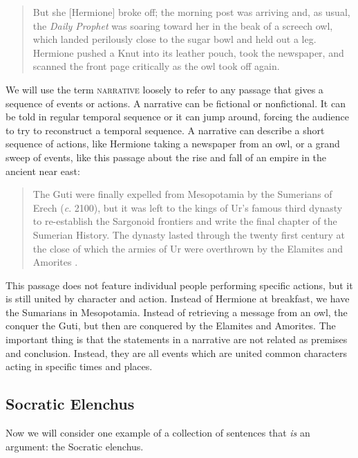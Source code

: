 \begin{quotation} \noindent But she [Hermione] broke off; the morning post was arriving and, as usual, the \textit{Daily Prophet} was soaring toward her in the beak of a screech owl, which landed perilously close to the sugar bowl and held out a leg. Hermione pushed a Knut into its leather pouch, took the newspaper, and scanned the front page critically as the owl took off again. \cite{Rowling2003} \end{quotation}

We will use the term \textsc{\gls{narrative}} \label{def:narrative} loosely to refer to any passage that gives a sequence of events or actions. A narrative can be fictional or nonfictional. It can be told in regular temporal sequence or it can jump around, forcing the audience to try to reconstruct a temporal sequence. A narrative can describe a short sequence of actions, like Hermione taking a newspaper from an owl, or a grand sweep of events, like this passage about the  rise and fall of an empire in the ancient near east:

\begin{quotation}
The Guti were finally expelled from Mesopotamia by the Sumerians of Erech (\textit{c}. 2100), but it was left to the kings of Ur's famous third dynasty to re-establish the Sargonoid frontiers and write the final chapter of the Sumerian History. The dynasty lasted through the twenty first century at the close of which the armies of Ur were overthrown by the Elamites and Amorites \cite{McEvedy1967}.
\end{quotation}

This passage does not feature individual people performing specific actions, but it is still united by character and action. Instead of Hermione at breakfast, we have the Sumarians in Mesopotamia. Instead of retrieving a message from an owl, the conquer the Guti, but then are conquered by the Elamites and Amorites. The important thing is that the statements in a narrative are not related as premises and conclusion. Instead, they are all events which are united common characters acting in specific times and places.

\subsection{Socratic Elenchus}

Now we will consider one example of a collection of sentences that \emph{is} an argument: the Socratic elenchus.

